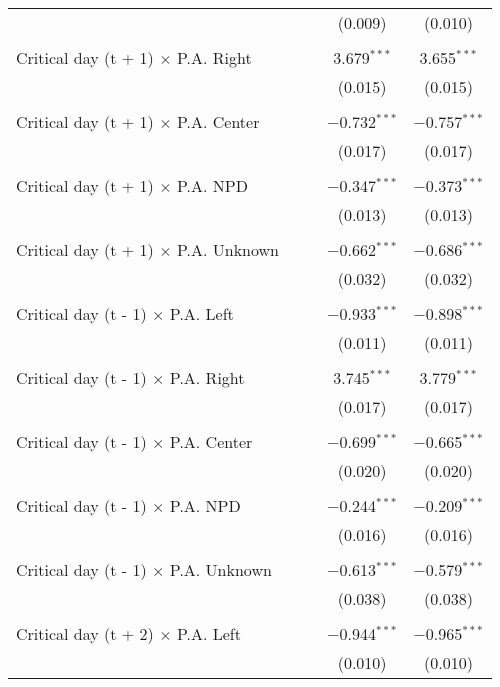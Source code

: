 \documentclass[
]{article}
\begin{document}
\begin{table}[!htbp]
{\begin{tabular}{@{\extracolsep{5pt}}lcccc}
  &  &  & (0.009) & (0.010) \\ 
  & & & & \\ 
 Critical day (t + 1) $\times$ P.A. Right &  &  & 3.679$^{***}$ & 3.655$^{***}$ \\ 
  &  &  & (0.015) & (0.015) \\ 
  & & & & \\ 
 Critical day (t + 1) $\times$ P.A. Center &  &  & $-$0.732$^{***}$ & $-$0.757$^{***}$ \\ 
  &  &  & (0.017) & (0.017) \\ 
  & & & & \\ 
 Critical day (t + 1) $\times$ P.A. NPD &  &  & $-$0.347$^{***}$ & $-$0.373$^{***}$ \\ 
  &  &  & (0.013) & (0.013) \\ 
  & & & & \\ 
 Critical day (t + 1) $\times$ P.A. Unknown &  &  & $-$0.662$^{***}$ & $-$0.686$^{***}$ \\ 
  &  &  & (0.032) & (0.032) \\ 
  & & & & \\ 
 Critical day (t - 1) $\times$ P.A. Left &  &  & $-$0.933$^{***}$ & $-$0.898$^{***}$ \\ 
  &  &  & (0.011) & (0.011) \\ 
  & & & & \\ 
 Critical day (t - 1) $\times$ P.A. Right &  &  & 3.745$^{***}$ & 3.779$^{***}$ \\ 
  &  &  & (0.017) & (0.017) \\ 
  & & & & \\ 
 Critical day (t - 1) $\times$ P.A. Center &  &  & $-$0.699$^{***}$ & $-$0.665$^{***}$ \\ 
  &  &  & (0.020) & (0.020) \\ 
  & & & & \\ 
 Critical day (t - 1) $\times$ P.A. NPD &  &  & $-$0.244$^{***}$ & $-$0.209$^{***}$ \\ 
  &  &  & (0.016) & (0.016) \\ 
  & & & & \\ 
 Critical day (t - 1) $\times$ P.A. Unknown &  &  & $-$0.613$^{***}$ & $-$0.579$^{***}$ \\ 
  &  &  & (0.038) & (0.038) \\ 
  & & & & \\ 
 Critical day (t + 2) $\times$ P.A. Left &  &  & $-$0.944$^{***}$ & $-$0.965$^{***}$ \\ 
  &  &  & (0.010) & (0.010) \\ 

\end{tabular}}
\end{table}
\end{document}

